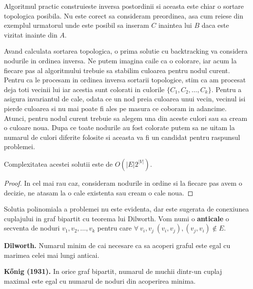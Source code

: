 Algoritmul practic construieste inversa postordinii si aceasta este chiar o sortare topologica posibila.
Nu este corect sa consideram preordinea, asa cum reiese din exemplul urmatorul unde este posibil sa inseram $C$
inaintea lui $B$ daca este vizitat inainte din $A$.

Avand calculata sortarea topologica, o prima solutie cu backtracking va considera nodurile in ordinea inversa.
Ne putem imagina caile ca o colorare, iar acum la fiecare pas al algoritmului trebuie sa stabilim culoarea pentru
nodul curent. Pentru ca le procesam in ordinea inversa sortarii topologice, stim ca am procesat deja toti vecinii lui
iar acestia sunt colorati in culorile $\{C_{1}, C_{2}, \ldots, C_{k}\}$. Pentru a asigura invariantul de cale, odata ce
un nod preia culoarea unui vecin, vecinul isi pierde culoarea si nu mai poate fi ales pe masura ce coboram in adancime.
Atunci, pentru nodul curent trebuie sa alegem una din aceste culori sau sa cream o culoare noua. Dupa ce toate nodurile
au fost colorate putem sa ne uitam la numarul de culori diferite folosite si aceasta va fi un candidat pentru raspunsul
problemei.

\begin{lem}
  Complexitatea acestei solutii este de $O(|E|2^{|V|})$.
\end{lem}

\begin{proof}
  In cel mai rau caz, consideram nodurile in ordine si la fiecare pas avem o decizie, ne atasam la o cale existenta sau cream o cale
  noua.
\end{proof}

\noindent Solutia polinomiala a problemei nu este evidenta, dar este sugerata de conexiunea cuplajului in graf bipartit cu teorema lui
Dilworth. Vom numi o \textbf{anticale} o secventa de noduri $v_{1}, v_{2}, \ldots, v_{k}$ pentru care
$\forall \ v_{i}, v_{j} \ (v_{i}, v_{j}), (v_{j}, v_{i}) \notin E$.

\begin{thm}
  \label{Dilworth}
  \textbf{Dilworth.} Numarul minim de cai necesare ca sa acoperi graful este egal cu marimea celei mai lungi anticai.
\end{thm}

\begin{thm}
  \label{Konig}
  \textbf{Kőnig (1931).} In orice graf bipartit, numarul de muchii dintr-un cuplaj maximal este egal cu numarul de noduri din acoperirea minima.
\end{thm}

